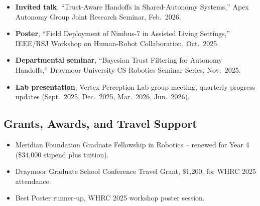 \begin{itemize}
  \item \textbf{Invited talk}, ``Trust-Aware Handoffs in Shared-Autonomy Systems,'' Apex
    Autonomy Group Joint Research Seminar, Feb.\ 2026.
  \item \textbf{Poster}, ``Field Deployment of Nimbus-7 in Assisted Living Settings,'' IEEE/RSJ
    Workshop on Human-Robot Collaboration, Oct.\ 2025.
  \item \textbf{Departmental seminar}, ``Bayesian Trust Filtering for Autonomy Handoffs,''
    Draymoor University CS Robotics Seminar Series, Nov.\ 2025.
  \item \textbf{Lab presentation}, Vertex Perception Lab group meeting, quarterly progress
    updates (Sept.\ 2025, Dec.\ 2025, Mar.\ 2026, Jun.\ 2026).
\end{itemize}

\subsection{Grants, Awards, and Travel Support}

\begin{itemize}
  \item Meridian Foundation Graduate Fellowship in Robotics -- renewed for Year 4 (\$34{,}000
    stipend plus tuition).
  \item Draymoor Graduate School Conference Travel Grant, \$1{,}200, for WHRC 2025 attendance.
  \item Best Poster runner-up, WHRC 2025 workshop poster session.
\end{itemize}
